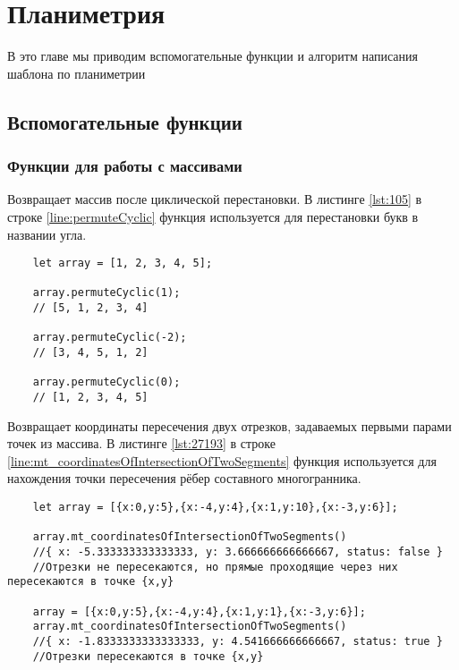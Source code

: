 
\section{Планиметрия}
В это главе мы приводим вспомогательные функции и алгоритм написания шаблона по планиметрии
\subsection{Вспомогательные функции}
\subsubsection{Функции для работы с массивами}
Возвращает массив после циклической перестановки.
В листинге \ref{lst:105} в строке \ref{line:permuteCyclic} функция используется для перестановки букв в названии угла.

\begin{lstlisting}
    let array = [1, 2, 3, 4, 5];

    array.permuteCyclic(1);
    // [5, 1, 2, 3, 4]

    array.permuteCyclic(-2);
    // [3, 4, 5, 1, 2]

    array.permuteCyclic(0);
    // [1, 2, 3, 4, 5]
    \end{lstlisting}

Возвращает координаты пересечения двух отрезков, задаваемых первыми парами точек из массива.
В листинге \ref{lst:27193} в строке \ref{line:mt_coordinatesOfIntersectionOfTwoSegments} функция используется для нахождения точки пересечения рёбер составного многогранника.

\begin{lstlisting}
    let array = [{x:0,y:5},{x:-4,y:4},{x:1,y:10},{x:-3,y:6}];

    array.mt_coordinatesOfIntersectionOfTwoSegments()
    //{ x: -5.333333333333333, y: 3.666666666666667, status: false }
    //Отрезки не пересекаются, но прямые проходящие через них пересекаются в точке {x,y}

    array = [{x:0,y:5},{x:-4,y:4},{x:1,y:1},{x:-3,y:6}];
    array.mt_coordinatesOfIntersectionOfTwoSegments()
    //{ x: -1.8333333333333333, y: 4.541666666666667, status: true }
    //Отрезки пересекаются в точке {x,y}
        
\end{lstlisting}

